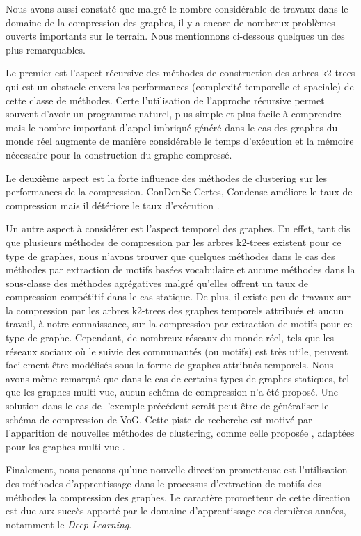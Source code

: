 				
				
								
								Nous avons aussi constaté que malgré le nombre considérable de travaux dans
le domaine de la compression des graphes, il y a encore
de nombreux problèmes ouverts importants sur le terrain. Nous mentionnons ci-dessous quelques un des plus remarquables.
 

Le premier est l'aspect récursive des méthodes de construction des arbres k2-trees qui est un obstacle envers les performances (complexité temporelle et spaciale) de cette classe de méthodes. Certe l'utilisation de l'approche récursive permet souvent d'avoir un programme naturel, plus simple et plus facile à comprendre mais le nombre important d'appel imbriqué généré dans le cas des graphes du monde réel augmente de manière considérable le temps d'exécution et la mémoire nécessaire pour la construction du graphe compressé. 

Le deuxième aspect est la forte influence des méthodes de clustering sur les performances de la compression. \gls{ConDenSe} Certes, Condense améliore le taux de compression mais il détériore le taux d'exécution \citep{liu2018reducing}.

Un autre aspect à considérer est l'aspect temporel des graphes. En effet, tant dis que plusieurs méthodes de compression par les arbres k2-trees existent pour ce type de graphes, nous n'avons trouver que quelques méthodes dans le cas des méthodes par extraction de motifs basées vocabulaire et aucune méthodes dans la sous-classe des méthodes agrégatives malgré qu'elles offrent un taux de compression compétitif dans le cas statique. De plus, il existe peu de travaux sur la compression par les arbres k2-trees des graphes temporels attribués et aucun travail, à notre connaissance, sur la compression par extraction de motifs pour ce type de graphe. Cependant, de nombreux réseaux du monde réel, tels que les réseaux sociaux où le suivie des communautés (ou motifs) est très utile, peuvent facilement être modélisés sous la forme de graphes attribués temporels. Nous avons même remarqué que dans le cas de certains types de graphes statiques, tel que les graphes multi-vue, aucun schéma de compression n'a été proposé. Une solution dans le cas de l'exemple précédent serait peut être de généraliser le schéma de compression de VoG. Cette piste de recherche est motivé par l'apparition de nouvelles méthodes de clustering, comme celle proposée \citep{wang2019study}, adaptées pour les graphes multi-vue .


Finalement, nous pensons qu'une nouvelle direction prometteuse est l'utilisation des méthodes d'apprentissage dans le processus d'extraction de motifs des méthodes la compression des graphes. Le caractère prometteur de cette direction est due aux succès apporté par le domaine d'apprentissage ces dernières années, notamment le \textit{Deep Learning}. %
								

